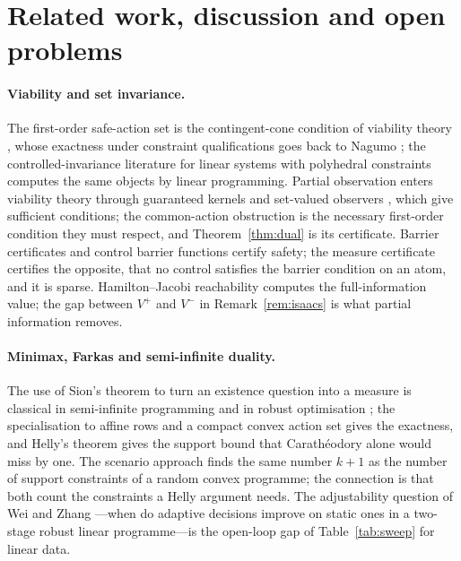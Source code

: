 \section{Related work, discussion and open problems}\label{sec:related}

\paragraph{Viability and set invariance.} The first-order safe-action set is the contingent-cone condition of viability theory \cite{Aubin1991,Aubin2011}, whose exactness under constraint qualifications goes back to Nagumo \cite{Nagumo1942}; the controlled-invariance literature for linear systems with polyhedral constraints \cite{Blanchini1999} computes the same objects by linear programming. Partial observation enters viability theory through guaranteed kernels and set-valued observers \cite{Cardaliaguet2007}, which give sufficient conditions; the common-action obstruction is the necessary first-order condition they must respect, and Theorem~\ref{thm:dual} is its certificate. Barrier certificates \cite{PrajnaJadbabaie2004} and control barrier functions \cite{Ames2017} certify safety; the measure certificate certifies the opposite, that no control satisfies the barrier condition on an atom, and it is sparse. Hamilton--Jacobi reachability \cite{Mitchell2005} computes the full-information value; the gap between $V^+$ and $V^-$ in Remark~\ref{rem:isaacs} is what partial information removes.

\paragraph{Minimax, Farkas and semi-infinite duality.} The use of Sion's theorem to turn an existence question into a measure is classical in semi-infinite programming \cite{HettichKortanek1993,AndersonNash1987} and in robust optimisation \cite{BenTalNemirovski1999,BenTal2009}; the specialisation to affine rows and a compact convex action set gives the exactness, and Helly's theorem gives the support bound that Carath\'eodory alone would miss by one. The scenario approach \cite{CalafioreCampi2006,CampiGaratti2008} finds the same number $k+1$ as the number of support constraints of a random convex programme; the connection is that both count the constraints a Helly argument needs. The adjustability question of Wei and Zhang \cite{WeiZhang2024}---when do adaptive decisions improve on static ones in a two-stage robust linear programme---is the open-loop gap of Table~\ref{tab:sweep} for linear data.

